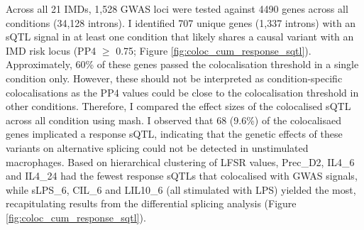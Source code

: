 Across all 21 IMDs, 1,528 GWAS loci were tested against 4490 genes across all conditions (34,128 introns). I identified 707 unique genes (1,337 introns) with an sQTL signal in at least one condition that likely shares a causal variant with an IMD risk locus (PP4 $\geq$ 0.75; Figure \ref{fig:coloc_cum_response_sqtl}). Approximately, 60\% of these genes passed the colocalisation threshold in a single condition only. However, these should not be interpreted as condition-specific colocalisations as the PP4 values could be close to the colocalisation threshold in other conditions. Therefore, I compared the effect sizes of the colocalised sQTL across all condition using mash. I observed that 68 (9.6\%) of the colocalisaed genes implicated a response sQTL, indicating that the genetic effects of these variants on alternative splicing could not be detected in unstimulated macrophages. Based on hierarchical clustering of LFSR values, Prec\_D2, IL4\_6 and IL4\_24 had the fewest response sQTLs that colocalised with GWAS signals, while sLPS\_6, CIL\_6 and LIL10\_6 (all stimulated with LPS) yielded the most, recapitulating results from the differential splicing analysis (Figure \ref{fig:coloc_cum_response_sqtl}). \\

